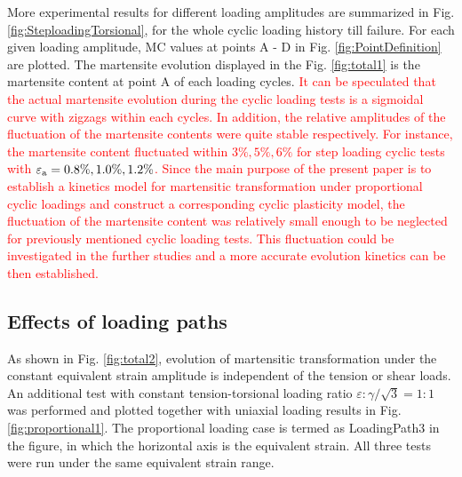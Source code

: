 \documentclass[final,5p,times,onecolumn,10pt,sort&compress]{elsarticle}
\newcommand{\marked}[1]{\textcolor{red}{#1}}
\begin{document}
More experimental results for different loading amplitudes are summarized in Fig. \ref{fig:SteploadingTorsional}, for the whole cyclic loading history till failure. For each given loading amplitude, MC values at points A - D in Fig. \ref{fig:PointDefinition} are plotted. The martensite evolution displayed in the Fig. \ref{fig:total1} is the martensite content at point A of each loading cycles. \marked{It can be speculated that the actual martensite evolution during the cyclic loading tests is a sigmoidal curve with zigzags within each cycles. In addition, the relative amplitudes of the fluctuation of the martensite contents were quite stable respectively. For instance, the martensite content fluctuated within $3\%,5\%,6\%$ for step loading cyclic tests with $\varepsilon_{\rm a}=0.8\%,1.0\%,1.2\%$. Since the main purpose of the present paper is to establish a kinetics model for martensitic transformation under proportional cyclic loadings and construct a corresponding cyclic plasticity model, the fluctuation of the martensite content was relatively small enough to be neglected for previously mentioned cyclic loading tests. This fluctuation could be investigated in the further studies and a more accurate evolution kinetics can be then established.}


\subsection{Effects of loading paths}
As shown in Fig. \ref{fig:total2}, evolution of martensitic transformation under the constant equivalent strain amplitude is independent of the tension or shear loads. An additional test with constant tension-torsional loading ratio $\varepsilon : \gamma /\sqrt{3}=1:1$ was performed and plotted together with uniaxial loading results in Fig.  \ref{fig:proportional1}. The proportional loading case is termed as LoadingPath3 in the figure, in which the horizontal axis is the equivalent strain. All three tests were run under the same equivalent strain range.
\end{document}
